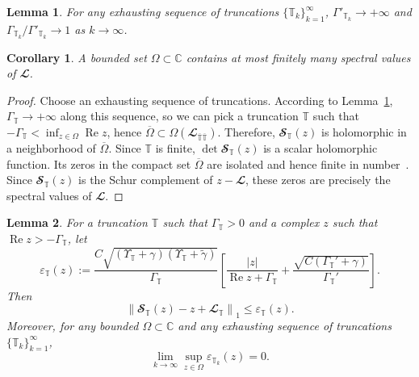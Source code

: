 \documentclass[10pt,a4paper]{amsart}
\renewcommand{\Re}{\operatorname{Re}}
\newcommand{\LI}{{\mathbb T}}
\newcommand{\LJ}{{\overline {\mathbb T}}}
\newcommand{\LJJ}{{\LJ\LJ}}
\newtheorem{lemma}{Lemma}
\newtheorem{corollary}{Corollary}
\begin{document}
\setcounter{lemma}{2}
\begin{lemma}
    For any exhausting sequence of truncations \(\{\LI_k\}_{k=1}^\infty\), $\Gamma'_{\LI_k} \to +\infty$ and $\Gamma_{\LI_k} / \Gamma'_{\LI_k} \to 1$ as $k \to \infty$.
    \label{lemma:decay-ratio}
\end{lemma}

\setcounter{corollary}{1}
\begin{corollary}
    A bounded set \(\Omega \subset \mathbb C\) contains at most finitely many spectral values of \(\mathbfcal L\).
    \label{lemma:spectrum-discreteness}
\end{corollary}
\begin{proof}
    Choose an exhausting sequence of truncations. According to Lemma~\ref{lemma:decay-ratio}, $\Gamma_\LI \to +\infty$ along this sequence, so we can pick a truncation \(\LI\) such that
       $ -\Gamma_\LI < \inf_{z \in \Omega} \Re z$, 
    hence
    $
        \overline{\Omega}
        \subset
        \Omega\left(\mathbfcal L_\LJJ\right).
    $
    Therefore, \(\mathbfcal S_\LI(z)\) is holomorphic in a neighborhood of \(\overline{\Omega}\). Since \(\LI\) is finite, \(\det \mathbfcal S_\LI(z)\) is a scalar holomorphic function. Its zeros in the compact set \(\overline{\Omega}\) are isolated and hence finite in number~\cite{Ablowitz2003}. Since $\mathbfcal S_\LI(z)$ is the Schur complement of $z - \mathbfcal L$, these zeros are precisely the spectral values of \(\mathbfcal L\).
\end{proof}

\setcounter{lemma}{3}
\setcounter{equation}{28}
\begin{lemma}
    For a truncation $\LI$ such that $\Gamma_\LI > 0$ and a complex $z$ such that $\Re z>-\Gamma_\LI$, let
    \begin{equation}
        \varepsilon_\LI(z)
        :=
        \frac{
            C\sqrt{(\Upsilon_\LI+\gamma)(\Upsilon_\LI+\tilde\gamma)}
        }{\Gamma_\LI}
        \left[
            \frac{|z|}{\Re z+\Gamma_\LI}
            +
            \frac{\sqrt{C(\Gamma_\LI'+\gamma)}}{\Gamma_\LI'}
        \right].
        \label{eq:schur-error-majorant}
    \end{equation}
    Then
    \begin{equation}
        \left \| \mathbfcal S_\LI(z) - z + {\mathbfcal L}_\LI \right \|_1
        \leqslant
        \varepsilon_\LI(z).
        \label{eq:schur-error-bound}
    \end{equation}
    Moreover, for any bounded $\Omega \subset \mathbb C$ and any exhausting sequence of truncations $\{\LI_k\}_{k=1}^{\infty}$,
    \begin{equation}
        \lim_{k\to\infty}
        \sup_{z\in\Omega}
        \varepsilon_{\LI_k}(z)
        =0.
    \end{equation}
    \label{lemma:schur-convergence}
\end{lemma}
\end{document}

